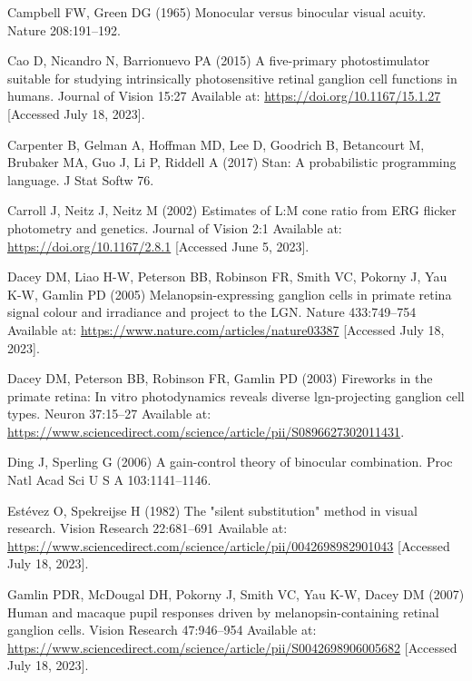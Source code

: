 \documentclass[
]{article}
\begin{document}
\leavevmode\hypertarget{ref-Campbell1965}{}%
Campbell FW, Green DG (1965) Monocular versus binocular visual acuity. Nature 208:191--192.

\leavevmode\hypertarget{ref-Cao2015}{}%
Cao D, Nicandro N, Barrionuevo PA (2015) A five-primary photostimulator suitable for studying intrinsically photosensitive retinal ganglion cell functions in humans. Journal of Vision 15:27 Available at: \url{https://doi.org/10.1167/15.1.27} {[}Accessed July 18, 2023{]}.

\leavevmode\hypertarget{ref-Carpenter2017}{}%
Carpenter B, Gelman A, Hoffman MD, Lee D, Goodrich B, Betancourt M, Brubaker MA, Guo J, Li P, Riddell A (2017) Stan: A probabilistic programming language. J Stat Softw 76.

\leavevmode\hypertarget{ref-Carroll2002}{}%
Carroll J, Neitz J, Neitz M (2002) Estimates of L:M cone ratio from ERG flicker photometry and genetics. Journal of Vision 2:1 Available at: \url{https://doi.org/10.1167/2.8.1} {[}Accessed June 5, 2023{]}.

\leavevmode\hypertarget{ref-Dacey2005}{}%
Dacey DM, Liao H-W, Peterson BB, Robinson FR, Smith VC, Pokorny J, Yau K-W, Gamlin PD (2005) Melanopsin-expressing ganglion cells in primate retina signal colour and irradiance and project to the LGN. Nature 433:749--754 Available at: \url{https://www.nature.com/articles/nature03387} {[}Accessed July 18, 2023{]}.

\leavevmode\hypertarget{ref-Dacey2003}{}%
Dacey DM, Peterson BB, Robinson FR, Gamlin PD (2003) Fireworks in the primate retina: In vitro photodynamics reveals diverse lgn-projecting ganglion cell types. Neuron 37:15--27 Available at: \url{https://www.sciencedirect.com/science/article/pii/S0896627302011431}.

\leavevmode\hypertarget{ref-Ding2006}{}%
Ding J, Sperling G (2006) A gain-control theory of binocular combination. Proc Natl Acad Sci U S A 103:1141--1146.

\leavevmode\hypertarget{ref-Estevez1982}{}%
Estévez O, Spekreijse H (1982) The "silent substitution" method in visual research. Vision Research 22:681--691 Available at: \url{https://www.sciencedirect.com/science/article/pii/0042698982901043} {[}Accessed July 18, 2023{]}.

\leavevmode\hypertarget{ref-Gamlin2007}{}%
Gamlin PDR, McDougal DH, Pokorny J, Smith VC, Yau K-W, Dacey DM (2007) Human and macaque pupil responses driven by melanopsin-containing retinal ganglion cells. Vision Research 47:946--954 Available at: \url{https://www.sciencedirect.com/science/article/pii/S0042698906005682} {[}Accessed July 18, 2023{]}.
\end{document}
